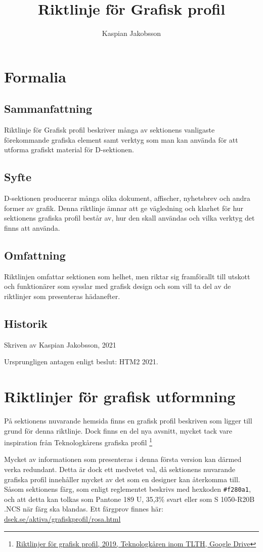\documentclass[]{dsekkallelse}
\title{Riktlinje för Grafisk profil}
\author{Kaspian Jakobsson}
\begin{document}
\section{Formalia}

\subsection{Sammanfattning}
Riktlinje för Grafisk profil beskriver många av sektionens vanligaste förekommande grafiska element samt verktyg som man kan använda för att utforma grafiskt material för D-sektionen.

\subsection{Syfte}
D-sektionen producerar många olika dokument, affischer, nyhetsbrev och andra former av grafik. Denna riktlinje ämnar att ge vägledning och klarhet för hur sektionens grafiska profil består av, hur den skall användas och vilka verktyg det finns att använda.

\subsection{Omfattning}
Riktlinjen omfattar sektionen som helhet, men riktar sig framförallt till utskott och funktionärer som sysslar med grafisk design och som vill ta del av de riktlinjer som presenteras hädanefter.

\subsection{Historik}
Skriven av Kaspian Jakobsson, 2021

Ursprungligen antagen enligt beslut:
HTM2 2021.


\section{Riktlinjer för grafisk utformning}
På sektionens nuvarande hemsida finns en grafisk profil beskriven som ligger till grund för denna riktlinje. Dock finns en del nya avsnitt, mycket tack vare inspiration från Teknologkårens grafiska profil \footnote{\href{https://drive.google.com/file/d/1EFdTyU6aXKSBEj4cqcDsR325LMzTP_um/view}{Riktlinjer för grafisk profil, 2019, Teknologkåren inom TLTH, Google Drive}}




Mycket av informationen som presenteras i denna första version kan därmed verka redundant. Detta är dock ett medvetet val, då sektionens nuvarande grafiska profil innehåller mycket av det som en designer kan återkomma till. Såsom sektionens färg, som enligt reglementet beskrivs med hexkoden \texttt{\#f280a1}, och att detta kan tolkas som Pantone 189 U, 35,3\% svart eller som S 1050-R20B .NCS när färg ska blandas.
Ett färgprov finnes här: \\ \href{https://www.dsek.se/aktiva/grafiskprofil/rosa.html}{dsek.se/aktiva/grafiskprofil/rosa.html}
\end{document}
